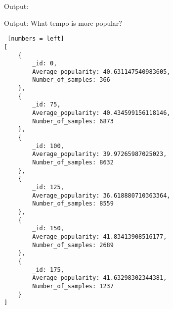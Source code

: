 \documentclass{Configuration_Files/PoliMi3i_thesis}
\begin{document}
Output:
\begin{algorithm}[ht]
\caption{Output: What tempo is more popular?}
\begin{lstlisting} [numbers = left]
[
	{
		_id: 0,
		Average_popularity: 40.631147540983605,
		Number_of_samples: 366
	},
	{
		_id: 75,
		Average_popularity: 40.434599156118146,
		Number_of_samples: 6873
	},
	{
		_id: 100,
		Average_popularity: 39.97265987025023,
		Number_of_samples: 8632
	},
	{
		_id: 125,
		Average_popularity: 36.618880710363364,
		Number_of_samples: 8559
	},
	{
		_id: 150,
		Average_popularity: 41.83413908516177,
		Number_of_samples: 2689
	},
	{
		_id: 175,
		Average_popularity: 41.63298302344381,
		Number_of_samples: 1237
	}
]
\end{lstlisting}
\end{algorithm}



\end{document}
